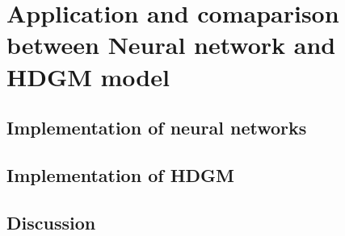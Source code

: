 \section{Application and comaparison between Neural network and HDGM model}
\subsection{Implementation of neural networks}
\subsection{Implementation of HDGM }
\subsection{Discussion}

